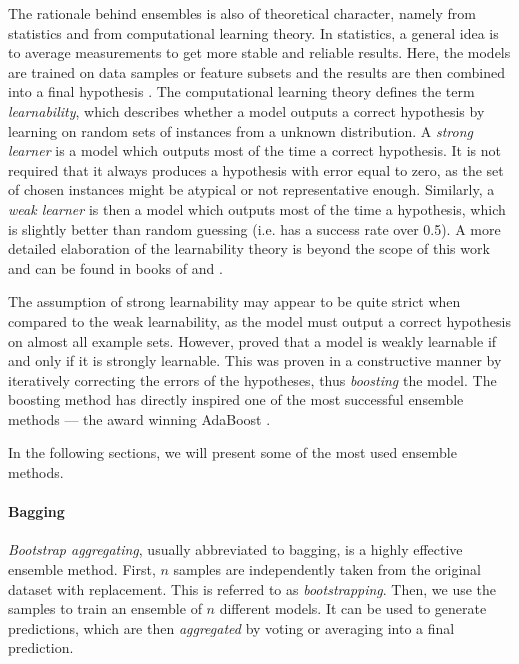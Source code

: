 The rationale behind ensembles is also of theoretical character, namely from
statistics and from computational learning theory. In statistics, a general
idea is to average measurements to get more stable and reliable results.
Here, the models are trained on data samples or feature subsets and the results
are then combined into a final hypothesis \citep[p.~330]{Flach:2012:MLA:2490546}.
The computational learning theory defines the term \emph{learnability},
which describes whether a model outputs a correct hypothesis by learning on
random sets of instances from a unknown distribution. A \emph{strong learner}
is a model which outputs most of the time a correct hypothesis. It is not
required that it always produces a hypothesis with error equal to zero, as 
the set of chosen instances might be atypical or not representative enough.
Similarly, a \emph{weak learner} is then a model which outputs most of the time
a hypothesis, which is slightly better than random guessing (i.e. has a
success rate over 0.5). A more detailed elaboration of the learnability
theory is beyond the scope of this work and can be found in books 
of \citep{Flach:2012:MLA:2490546} and \citep{Mitchell:1997:ML:541177}.

The assumption of strong learnability may appear to be quite strict when 
compared to the weak learnability, as the model must output a correct 
hypothesis on almost all example sets. However,
\cite{Schapire:1990:SWL:83637.83645} proved that a model 
is weakly learnable if and only if it is strongly learnable. 
 This was proven in a constructive manner
by iteratively correcting the errors of the hypotheses, thus \emph{boosting} 
the model. The boosting method has directly inspired one of the most successful
ensemble methods --- the award winning AdaBoost
\citep{Freund:1996:ENB:3091696.3091715, Freund:1997:DGO:261540.261549}.

In the following sections, we will present some of the most used ensemble 
methods.
\paragraph{Bagging} \label{bagging}
\emph{Bootstrap aggregating}, usually abbreviated to bagging, is a highly
effective ensemble method. First, $n$ samples are independently taken from 
the original dataset with replacement. This is referred to as 
\emph{bootstrapping}. Then, we use the samples to train an ensemble of $n$
different models. It can be used to generate predictions, which are
then \emph{aggregated} by voting or averaging into a final prediction.

